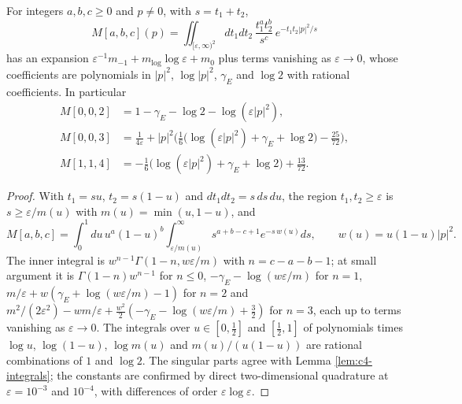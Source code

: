 \begin{lemma}
\label{lem:c20-masters}
For integers $a,b,c\ge0$ and $p\ne0$, with $s=t_1+t_2$,
\[
M[a,b,c](p)=\iint_{[\varepsilon,\infty)^2}dt_1dt_2\,\frac{t_1^at_2^b}{s^c}\,e^{-t_1t_2|p|^2/s}
\]
has an expansion $\varepsilon^{-1}m_{-1}+m_{\log}\log\varepsilon+m_0$ plus terms vanishing as $\varepsilon\to0$, whose coefficients are polynomials in $|p|^2$, $\log|p|^2$, $\gamma_E$ and $\log2$ with rational coefficients. In particular
\begin{equation}
\begin{aligned}
M[0,0,2]&=1-\gamma_E-\log2-\log(\varepsilon|p|^2),\\
M[0,0,3]&=\frac1{4\varepsilon}+|p|^2\Big(\frac16\big(\log(\varepsilon|p|^2)+\gamma_E+\log2\big)-\frac{25}{72}\Big),\\
M[1,1,4]&=-\frac16\big(\log(\varepsilon|p|^2)+\gamma_E+\log2\big)+\frac{13}{72}.
\end{aligned}
\label{eq:c20-masters}
\end{equation}
\end{lemma}

\begin{proof}
With $t_1=su$, $t_2=s(1-u)$ and $dt_1dt_2=s\,ds\,du$, the region $t_1,t_2\ge\varepsilon$ is $s\ge\varepsilon/m(u)$ with $m(u)=\min(u,1-u)$, and
\[
M[a,b,c]=\int_0^1du\,u^a(1-u)^b\int_{\varepsilon/m(u)}^\infty s^{a+b-c+1}e^{-s\,w(u)}ds,\qquad w(u)=u(1-u)|p|^2 .
\]
The inner integral is $w^{n-1}\Gamma(1-n,w\varepsilon/m)$ with $n=c-a-b-1$; at small argument it is $\Gamma(1-n)w^{n-1}$ for $n\le0$, $-\gamma_E-\log(w\varepsilon/m)$ for $n=1$, $m/\varepsilon+w(\gamma_E+\log(w\varepsilon/m)-1)$ for $n=2$ and $m^2/(2\varepsilon^2)-wm/\varepsilon+\tfrac{w^2}2(-\gamma_E-\log(w\varepsilon/m)+\tfrac32)$ for $n=3$, each up to terms vanishing as $\varepsilon\to0$. The integrals over $u\in[0,\tfrac12]$ and $[\tfrac12,1]$ of polynomials times $\log u$, $\log(1-u)$, $\log m(u)$ and $m(u)/(u(1-u))$ are rational combinations of $1$ and $\log2$. The singular parts agree with Lemma \ref{lem:c4-integrals}; the constants are confirmed by direct two-dimensional quadrature at $\varepsilon=10^{-3}$ and $10^{-4}$, with differences of order $\varepsilon\log\varepsilon$.
\end{proof}

